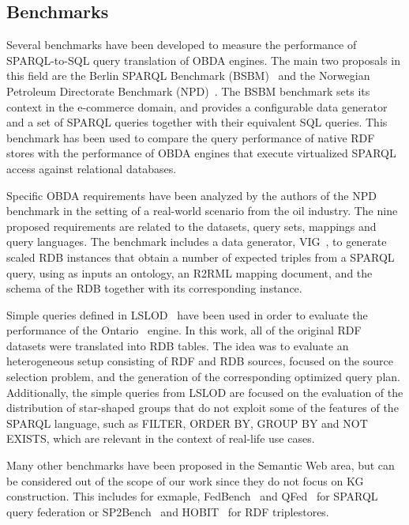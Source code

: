 \subsection{Benchmarks}
\label{chap2:soa-bench}
Several benchmarks have been developed to measure the performance of SPARQL-to-SQL query translation of OBDA engines. The main two proposals in this field are the Berlin SPARQL Benchmark (BSBM)~\citep{bizer2009berlin} and the Norwegian Petroleum Directorate Benchmark (NPD)~\citep{lanti2015npd}. The BSBM benchmark sets its context in the e-commerce domain, and provides a configurable data generator and a set of SPARQL queries together with their equivalent SQL queries. This benchmark has been used to compare the query performance of native RDF stores with the performance of OBDA engines that execute virtualized SPARQL access against relational databases.

Specific OBDA requirements have been analyzed by the authors of the NPD benchmark in the setting of a real-world scenario from the oil industry. The nine proposed requirements are related to the datasets, query sets, mappings and query languages. The benchmark includes a data generator, VIG~\citep{lantivig}, to generate scaled RDB instances that obtain a number of expected triples from a SPARQL query, using as inputs an ontology, an R2RML mapping document, and the schema of the RDB together with its corresponding instance. 

Simple queries defined in LSLOD~\citep{hasnain2017biofed} have been used in order to evaluate the performance of the Ontario~\citep{endris2019ontario} engine. In this work, all of the original RDF datasets were translated into RDB tables. The idea was to evaluate an heterogeneous setup consisting of RDF and RDB sources, focused on the source selection problem, and the generation of the corresponding optimized query plan. Additionally, the simple queries from LSLOD are focused on the evaluation of the distribution of star-shaped groups that do not exploit some of the features of the SPARQL language, such as FILTER, ORDER BY, GROUP BY and NOT EXISTS, which are relevant in the context of  real-life use cases.

Many other benchmarks have been proposed in the Semantic Web area, but can be considered out of the scope of our work since they do not focus on KG construction. This includes for exmaple, FedBench~\citep{schmidt2011fedbench} and QFed~\citep{rakhmawati2014qfed} for SPARQL query federation or SP2Bench~\citep{schmidt2009sp} and HOBIT~\citep{roder2020hobbit} for RDF triplestores.

